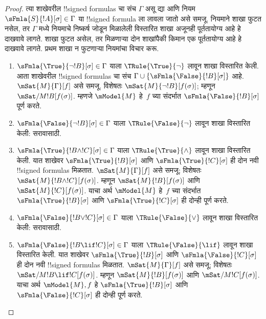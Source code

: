 \documentclass[../../../include/open-logic-section]{subfiles}
\begin{document}
\begin{proof}
त्या शाखेवरील !!{signed formula}s चा संच
$\Gamma$ असू द्या आणि नियम
$\sFmla{S}{!A}[\sigma] \in \Gamma$ या
!!{signed formula} ला लावला जातो असे समजू.
नियमाने शाखा फुटत नसेल, तर $\Gamma$ मध्ये
नियमाचे निष्कर्ष जोडून मिळालेली विस्तारित
शाखा अजूनही पूर्ततायोग्य आहे हे दाखवावे लागते.
शाखा फुटत असेल, तर मिळणाऱ्या दोन शाखांपैकी
किमान एक पूर्ततायोग्य आहे हे दाखवावे लागते.
प्रथम शाखा न फुटणाऱ्या नियमांचा विचार करू.
\begin{enumerate}
\item $\sFmla{\True}{\lnot !B}[\sigma] \in \Gamma$
  याला
  $\TRule{\True}{\lnot}$ लावून शाखा विस्तारित
  केली. आता शाखेवरील !!{signed formula}s चा
  संच $\Gamma \cup
  \{\sFmla{\False}{!B}[\sigma]\}$ आहे.
  $\mSat{M}{\Gamma}[f]$ असे समजू. विशेषतः
  $\mSat{M}{\lnot !B}[f(\sigma)]$; म्हणून
  $\mSat/{M}{!B}[f(\sigma)]$. म्हणजे
  $\mModel{M}$ हे~$f$ च्या संदर्भात
  $\sFmla{\False}{!B}[\sigma]$ पूर्ण करते.
\item $\sFmla{\False}{\lnot !B}[\sigma] \in \Gamma$
  याला
  $\TRule{\False}{\lnot}$ लावून शाखा विस्तारित
  केली: सरावासाठी.
\item $\sFmla{\True}{!B \land !C}[\sigma] \in \Gamma$
  याला
  $\TRule{\True}{\land}$ लावून शाखा विस्तारित
  केली. यात शाखेवर
  $\sFmla{\True}{!B}[\sigma]$ आणि
  $\sFmla{\True}{!C}[\sigma]$ ही दोन नवी
  !!{signed formula}s मिळतात.
  $\mSat{M}{\Gamma}[f]$ असे समजू; विशेषतः
  $\mSat{M}{!B \land !C}[f(\sigma)]$.
  म्हणून $\mSat{M}{!B}[f(\sigma)]$ आणि
  $\mSat{M}{!C}[f(\sigma)]$. याचा अर्थ
  $\mModel{M}$ हे~$f$ च्या संदर्भात
  $\sFmla{\True}{!B}[\sigma]$ आणि
  $\sFmla{\True}{!C}[\sigma]$ ही दोन्ही
  पूर्ण करते.
\item $\sFmla{\False}{!B \lor !C}[\sigma] \in \Gamma$
  याला
  $\TRule{\False}{\lor}$ लावून शाखा विस्तारित
  केली: सरावासाठी.
\item $\sFmla{\False}{!B \lif !C}[\sigma] \in \Gamma$
  याला
  $\TRule{\False}{\lif}$ लावून शाखा विस्तारित
  केली. यात शाखेवर
  $\sFmla{\True}{!B}[\sigma]$ आणि
  $\sFmla{\False}{!C}[\sigma]$ ही दोन नवी
  !!{signed formula}s मिळतात.
  $\mSat{M}{\Gamma}[f]$ असे समजू; विशेषतः
  $\mSat/{M}{!B \lif !C}[f(\sigma)]$.
  म्हणून $\mSat{M}{!B}[f(\sigma)]$ आणि
  $\mSat/{M}{!C}[f(\sigma)]$. याचा अर्थ
  $\mModel{M}, f$ हे
  $\sFmla{\True}{!B}[\sigma]$ आणि
  $\sFmla{\False}{!C}[\sigma]$ ही दोन्ही
  पूर्ण करते.

\end{enumerate}
\end{proof}
\end{document}
